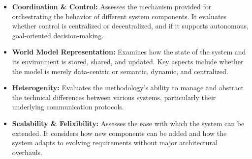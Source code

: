 \documentclass{article} %
\begin{document}
\begin{itemize}
\item \textbf{Coordination \& Control:} Assesses the mechanism provided for orchestrating the behavior of different system components. It evaluates whether control is centralized or decentralized, and if it supports autonomous, goal-oriented decision-making.

\item \textbf{World Model Representation:} Examines how the state of the system and its environment is stored, shared, and updated. Key aspects include whether the model is merely data-centric or semantic, dynamic, and centralized.

\item \textbf{Heterogenity:} Evaluates the methodology's ability to manage and abstract the technical differences between various systems, particularly their underlying communication protocols.

\item \textbf{Scalability \& Felixibility:} Assesses the ease with which the system can be extended. It considers how new components can be added and how the system adapts to evolving requirements without major architectural overhauls.

\end{itemize}
\end{document}
